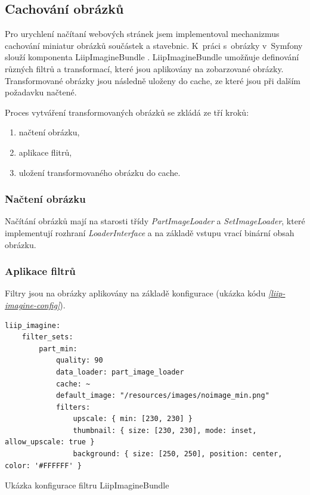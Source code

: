 \subsection{Cachování obrázků}
Pro urychlení načítaní webových stránek jsem implementoval mechanizmus cachování miniatur obrázků součástek a stavebnic. K~práci s~obrázky v~Symfony slouží komponenta LiipImagineBundle \autocite{liipimagine}. LiipImagineBundle umožňuje definování různých filtrů a transformací, které jsou aplikovány na zobarzované obrázky. Transformované obrázky jsou následně uloženy do cache, ze které jsou při dalším požadavku načtené.

Proces vytváření transformovaných obrázků se zkládá ze tří kroků:
\begin{enumerate}
    \item načtení obrázku,
    \item aplikace flitrů,
    \item uložení transformovaného obrázku do cache.
\end{enumerate}

\subsubsection*{Načtení obrázku}
Načítání obrázků mají na starosti třídy \textit{PartImageLoader} a \textit{SetImageLoader}, které implementují rozhraní \textit{LoaderInterface} a na základě vstupu vrací binární obsah obrázku. 






\subsubsection*{Aplikace filtrů}
Filtry jsou na obrázky aplikovány na základě konfigurace (ukázka kódu \emph{\ref{liip-imagine-config}}).  

\begin{listing}[htbp]
  \begin{verbatim}
liip_imagine:
    filter_sets:
        part_min:
            quality: 90
            data_loader: part_image_loader
            cache: ~
            default_image: "/resources/images/noimage_min.png"
            filters:
                upscale: { min: [230, 230] }
                thumbnail: { size: [230, 230], mode: inset, allow_upscale: true }
                background: { size: [250, 250], position: center, color: '#FFFFFF' }
  \end{verbatim}
  \caption{Ukázka konfigurace filtru LiipImagineBundle\label{liip-imagine-config}}
\end{listing}



